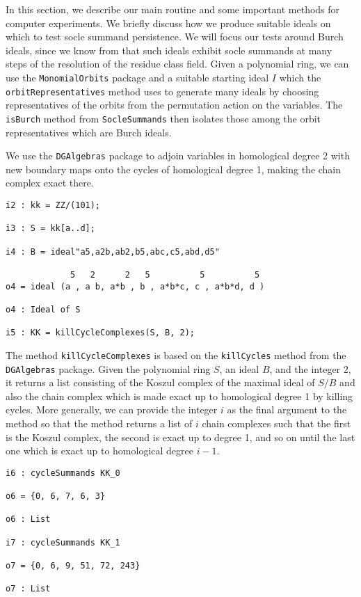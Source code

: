 \documentclass[twoside,12pt, leqno]{amsart}
\begin{document}
In this section, we describe our main routine and some important methods for computer experiments. We briefly discuss how we produce suitable ideals on which to test socle summand persistence. We will focus our tests around Burch ideals, since we know from \cite{DE23} that such ideals exhibit socle summands at many steps of the resolution of the residue class field. Given a polynomial ring, we can use the \texttt{MonomialOrbits} package and a suitable starting ideal $I$ which the \texttt{orbitRepresentatives} method uses to generate many ideals by choosing representatives of the orbits from the permutation action on the variables. The \texttt{isBurch} method from \texttt{SocleSummands} then isolates those among the orbit representatives which are Burch ideals.

\begin{example}
	We use the \texttt{DGAlgebras} package to adjoin variables in homological degree 2 with new boundary maps onto the cycles of homological degree 1, making the chain complex exact there.
\end{example}

\begin{footnotesize}
\begin{verbatim}
i2 : kk = ZZ/(101);

i3 : S = kk[a..d];

i4 : B = ideal"a5,a2b,ab2,b5,abc,c5,abd,d5"

             5   2      2   5          5          5
o4 = ideal (a , a b, a*b , b , a*b*c, c , a*b*d, d )

o4 : Ideal of S

i5 : KK = killCycleComplexes(S, B, 2);
\end{verbatim}
\end{footnotesize}

The method \texttt{killCycleComplexes} is based on the \texttt{killCycles} method from the \texttt{DGAlgebras} package. Given the polynomial ring $S$, an ideal $B$, and the integer 2, it returns a list consisting of the Koszul complex of the maximal ideal of $S / B$ and also the chain complex which is made exact up to homological degree 1 by killing cycles. More generally, we can provide the integer $i$ as the final argument to the method so that the method returns a list of $i$ chain complexes such that the first is the Koszul complex, the second is exact up to degree 1, and so on until the last one which is exact up to homological degree $i-1$.

\begin{footnotesize}
\begin{verbatim}
i6 : cycleSummands KK_0

o6 = {0, 6, 7, 6, 3}

o6 : List

i7 : cycleSummands KK_1

o7 = {0, 6, 9, 51, 72, 243}

o7 : List
\end{verbatim}
\end{footnotesize}
\end{document}
